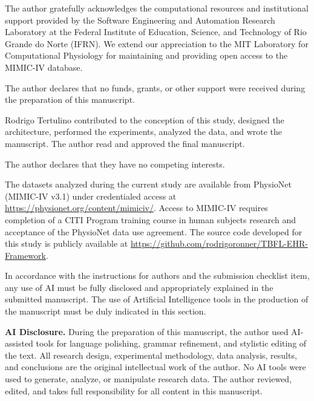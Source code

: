 \documentclass[english]{sbc2025}
\begin{document}
\begin{declarations}

\begin{acknowledgements}
The author gratefully acknowledges the computational resources and institutional support provided by the Software Engineering and Automation Research Laboratory at the Federal Institute of Education, Science, and Technology of Rio Grande do Norte (IFRN). We extend our appreciation to the MIT Laboratory for Computational Physiology for maintaining and providing open access to the MIMIC-IV database.
\end{acknowledgements}

\begin{funding}
The author declares that no funds, grants, or other support were received during the preparation of this manuscript.
\end{funding}

\begin{contributions}
Rodrigo Tertulino contributed to the conception of this study, designed the architecture, performed the experiments, analyzed the data, and wrote the manuscript. The author read and approved the final manuscript.
\end{contributions}

\begin{interests}
The author declares that they have no competing interests.
\end{interests}

\begin{materials}
The datasets analyzed during the current study are available from PhysioNet (MIMIC-IV v3.1) under credentialed access at \url{https://physionet.org/content/mimiciv/}. Access to MIMIC-IV requires completion of a CITI Program training course in human subjects research and acceptance of the PhysioNet data use agreement. The source code developed for this study is publicly available at \url{https://github.com/rodrigoronner/TBFL-EHR-Framework}.
\end{materials}

\begin{furtherinformation}

In accordance with the instructions for authors and the submission checklist item, any use of AI must be fully disclosed and appropriately explained in the submitted manuscript. The use of Artificial Intelligence tools in the production of the manuscript must be duly indicated in this section.

\textbf{AI Disclosure.} During the preparation of this manuscript, the author used AI-assisted tools for language polishing, grammar refinement, and stylistic editing of the text. All research design, experimental methodology, data analysis, results, and conclusions are the original intellectual work of the author. No AI tools were used to generate, analyze, or manipulate research data. The author reviewed, edited, and takes full responsibility for all content in this manuscript.


\end{furtherinformation}
\end{declarations}
\end{document}
